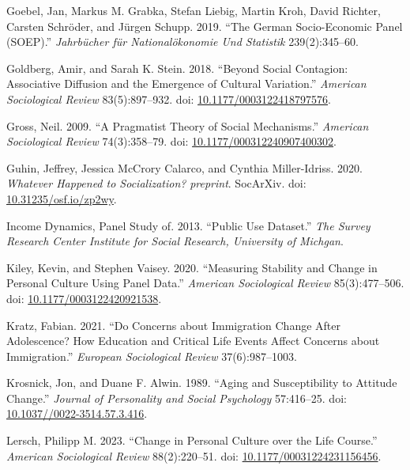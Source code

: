 \documentclass[
  11pt,
]{article}
\newlength{\cslhangindent}
\newenvironment{CSLReferences}[2] %
 {\begin{list}{}{%
  \setlength{\itemindent}{0pt}
  \setlength{\leftmargin}{0pt}
  \setlength{\parsep}{0pt}
  \ifodd #1
   \setlength{\leftmargin}{\cslhangindent}
   \setlength{\itemindent}{-1\cslhangindent}
  \fi
  \setlength{\itemsep}{#2\baselineskip}}}
 {\end{list}}
\begin{document}
\begin{CSLReferences}{1}{1}
Goebel, Jan, Markus M. Grabka, Stefan Liebig, Martin Kroh, David
Richter, Carsten Schröder, and Jürgen Schupp. 2019. {``The German
Socio-Economic Panel (SOEP).''} \emph{Jahrb{ü}cher f{ü}r
National{ö}konomie Und Statistik} 239(2):345--60.

Goldberg, Amir, and Sarah K. Stein. 2018. {``Beyond {Social}
{Contagion}: {Associative} {Diffusion} and the {Emergence} of {Cultural}
{Variation}.''} \emph{American Sociological Review} 83(5):897--932. doi:
\href{https://doi.org/10.1177/0003122418797576}{10.1177/0003122418797576}.

Gross, Neil. 2009. {``A {Pragmatist} {Theory} of {Social}
{Mechanisms}.''} \emph{American Sociological Review} 74(3):358--79. doi:
\href{https://doi.org/10.1177/000312240907400302}{10.1177/000312240907400302}.

Guhin, Jeffrey, Jessica McCrory Calarco, and Cynthia Miller-Idriss.
2020. \emph{Whatever {Happened} to {Socialization}?} \emph{preprint}.
SocArXiv. doi:
\href{https://doi.org/10.31235/osf.io/zp2wy}{10.31235/osf.io/zp2wy}.

Income Dynamics, Panel Study of. 2013. {``Public Use Dataset.''}
\emph{The Survey Research Center Institute for Social Research,
University of Michgan}.

Kiley, Kevin, and Stephen Vaisey. 2020. {``Measuring {Stability} and
{Change} in {Personal} {Culture} {Using} {Panel} {Data}.''}
\emph{American Sociological Review} 85(3):477--506. doi:
\href{https://doi.org/10.1177/0003122420921538}{10.1177/0003122420921538}.

Kratz, Fabian. 2021. {``Do Concerns about Immigration Change After
Adolescence? How Education and Critical Life Events Affect Concerns
about Immigration.''} \emph{European Sociological Review}
37(6):987--1003.

Krosnick, Jon, and Duane F. Alwin. 1989. {``Aging and {Susceptibility}
to {Attitude} {Change}.''} \emph{Journal of Personality and Social
Psychology} 57:416--25. doi:
\href{https://doi.org/10.1037//0022-3514.57.3.416}{10.1037//0022-3514.57.3.416}.

Lersch, Philipp M. 2023. {``Change in {Personal} {Culture} over the
{Life} {Course}.''} \emph{American Sociological Review} 88(2):220--51.
doi:
\href{https://doi.org/10.1177/00031224231156456}{10.1177/00031224231156456}.


\end{CSLReferences}
\end{document}
